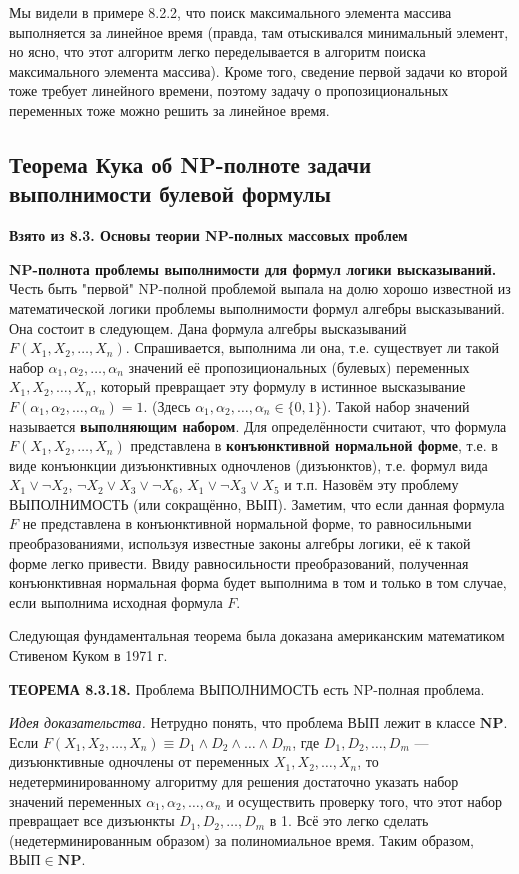\documentclass[a4paper,12pt]{article}
\begin{document}
Мы видели в примере 8.2.2, что поиск максимального элемента массива выполняется за линейное время (правда, там отыскивался минимальный элемент, но ясно, что этот алгоритм легко переделывается в алгоритм поиска максимального элемента массива). Кроме того, сведение первой задачи ко второй тоже требует линейного времени, поэтому задачу о пропозициональных переменных тоже можно решить за линейное время.

\subsection{Теорема Кука об NP-полноте задачи выполнимости булевой формулы}

\textbf{Взято из 8.3. Основы теории NP-полных массовых проблем}

\textbf{NP-полнота проблемы выполнимости для формул логики высказываний.} Честь быть "первой" NP-полной проблемой выпала на долю хорошо известной из математической логики проблемы выполнимости формул алгебры высказываний. Она состоит в следующем. Дана формула алгебры высказываний \(F(X_1, X_2, \dots, X_n)\). Спрашивается, выполнима ли она, т.е. существует ли такой набор \(\alpha_1, \alpha_2, \dots, \alpha_n\) значений её пропозициональных (булевых) переменных \(X_1, X_2, \dots, X_n\), который превращает эту формулу в истинное высказывание \(F(\alpha_1, \alpha_2, \dots, \alpha_n) = 1\). (Здесь \(\alpha_1, \alpha_2, \dots, \alpha_n \in \{0, 1\}\)). Такой набор значений называется \textbf{выполняющим набором}. Для определённости считают, что формула \(F(X_1, X_2, \dots, X_n)\) представлена в \textbf{конъюнктивной нормальной форме}, т.е. в виде конъюнкции дизъюнктивных одночленов (дизъюнктов), т.е. формул вида \(X_1 \lor \neg X_2\), \(\neg X_2 \lor X_3 \lor \neg X_6\), \(X_1 \lor \neg X_3 \lor X_5\) и т.п. Назовём эту проблему ВЫПОЛНИМОСТЬ (или сокращённо, ВЫП). Заметим, что если данная формула \(F\) не представлена в конъюнктивной нормальной форме, то равносильными преобразованиями, используя известные законы алгебры логики, её к такой форме легко привести. Ввиду равносильности преобразований, полученная конъюнктивная нормальная форма будет выполнима в том и только в том случае, если выполнима исходная формула \(F\).

Следующая фундаментальная теорема была доказана американским математиком Стивеном Куком в 1971 г.

\textbf{ТЕОРЕМА 8.3.18.} Проблема ВЫПОЛНИМОСТЬ есть NP-полная проблема.

\textit{Идея доказательства.} Нетрудно понять, что проблема ВЫП лежит в классе \(\mathbf{NP}\). Если \(F(X_1, X_2, \dots, X_n) \equiv D_1 \land D_2 \land \dots \land D_m\), где \(D_1, D_2, \dots, D_m\) --- дизъюнктивные одночлены от переменных \(X_1, X_2, \dots, X_n\), то недетерминированному алгоритму для решения достаточно указать набор значений переменных \(\alpha_1, \alpha_2, \dots, \alpha_n\) и осуществить проверку того, что этот набор превращает все дизъюнкты \(D_1, D_2, \dots, D_m\) в 1. Всё это легко сделать (недетерминированным образом) за полиномиальное время. Таким образом, \(\text{ВЫП} \in \mathbf{NP}\).
\end{document}
